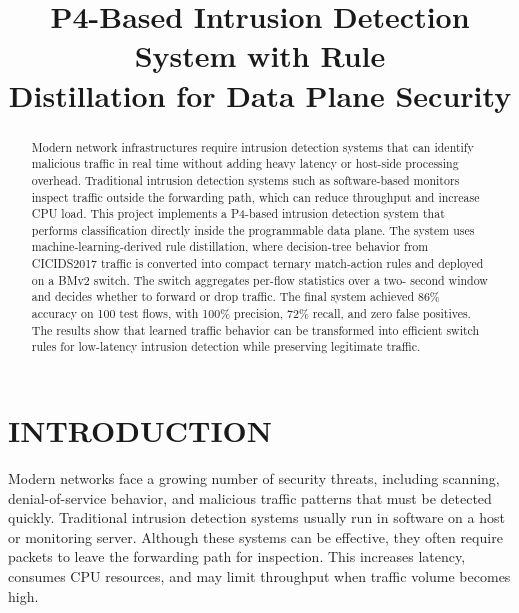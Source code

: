 \documentclass[conference]{IEEEtran}
\begin{document}
\title{
\centering
\fontsize{24}{28}\selectfont
\textbf{P4-Based Intrusion Detection System with Rule}\\[0.15cm]
\textbf{Distillation for Data Plane Security}
}

\author{
\vspace{0.15cm}
}

\maketitle

\begin{abstract}
Modern network infrastructures require intrusion
detection systems that can identify malicious traffic in real time
without adding heavy latency or host-side processing overhead.
Traditional intrusion detection systems such as software-based
monitors inspect traffic outside the forwarding path, which
can reduce throughput and increase CPU load. This project
implements a P4-based intrusion detection system that performs
classification directly inside the programmable data plane. The
system uses machine-learning-derived rule distillation, where
decision-tree behavior from CICIDS2017 traffic is converted into
compact ternary match-action rules and deployed on a BMv2
switch. The switch aggregates per-flow statistics over a two-
second window and decides whether to forward or drop traffic.
The final system achieved 86\% accuracy on 100 test flows,
with 100\% precision, 72\% recall, and zero false positives. The
results show that learned traffic behavior can be transformed into
efficient switch rules for low-latency intrusion detection while
preserving legitimate traffic.
\end{abstract}

\section{INTRODUCTION}

Modern networks face a growing number of security threats,
including scanning, denial-of-service behavior, and malicious
traffic patterns that must be detected quickly. Traditional
intrusion detection systems usually run in software on a host
or monitoring server. Although these systems can be effective,
they often require packets to leave the forwarding path for
inspection. This increases latency, consumes CPU resources,
and may limit throughput when traffic volume becomes high.
\end{document}
